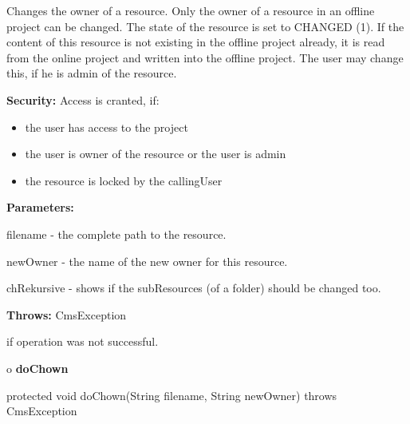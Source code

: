 \begin{description}
\htmlDD Changes the owner of a resource. \htmlBR
Only the owner of a resource in an offline project can be changed. The state
of the resource is set to CHANGED (1). If the content of this resource is not
existing in the offline project already, it is read from the online project
and written into the offline project. The user may change this, if he is admin
of the resource. 

{\bf Security:} Access is cranted, if: 

\begin{itemize}
\item the user has access to the project 
\item the user is owner of the resource or the user is admin 
\item the resource is locked by the callingUser 
\end{itemize}

\begin{description}
\item {\bf Parameters:}  

filename - the complete path to the resource.  

newOwner - the name of the new owner for this resource.  

chRekursive - shows if the subResources (of a folder) should be changed too.  
\item {\bf Throws:} CmsException  

if operation was not successful.  
\end{description}

\end{description}

o {\bf doChown} 

\begin{PRE}
 protected void doChown(String filename,
                        String newOwner) throws CmsException
\end{PRE}

